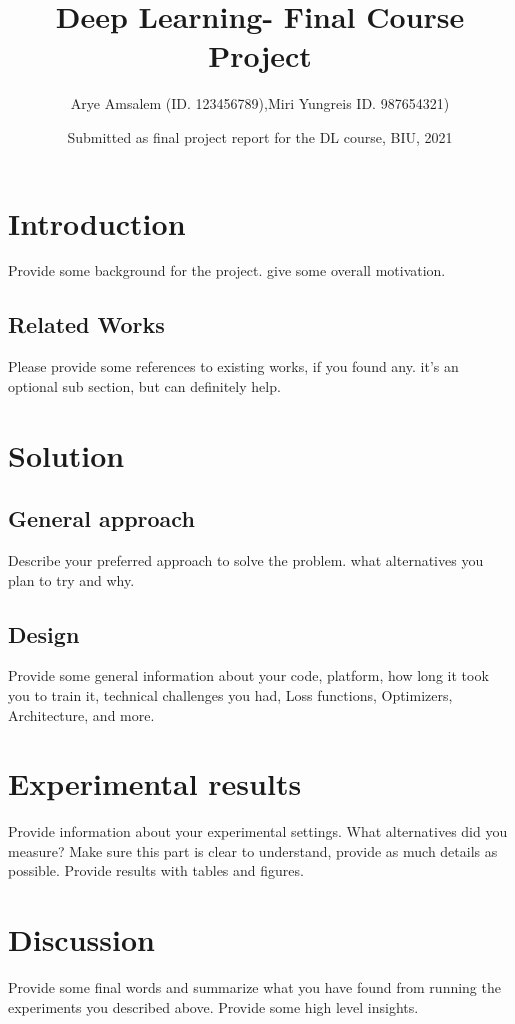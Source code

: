 \documentclass{article}
\title{Deep Learning- Final Course Project}
\author{Arye Amsalem (ID. 123456789),Miri Yungreis ID. 987654321)}
\date{Submitted as final project report for the DL course, BIU, 2021}
\begin{document}
\maketitle

\section{Introduction}

Provide some background for the project. give some overall motivation.

\subsection{Related Works}
Please provide some references to existing works, if you found any. it's an optional sub section, but can definitely help.



\section{Solution}
\subsection{General approach}
Describe your preferred approach to solve the problem. what alternatives you plan to try and why.

\subsection{Design}
Provide some general information about your code, platform, how long it took you to train it, technical challenges you had, Loss functions, Optimizers, Architecture, and more.

\section{Experimental results}
Provide information about your experimental settings. What alternatives did you measure? Make sure this part is clear to understand, provide as much details as possible. Provide results with tables and figures.

\section{Discussion}
Provide some final words and summarize what you have found from running the experiments you described above. Provide some high level insights.
\end{document}
